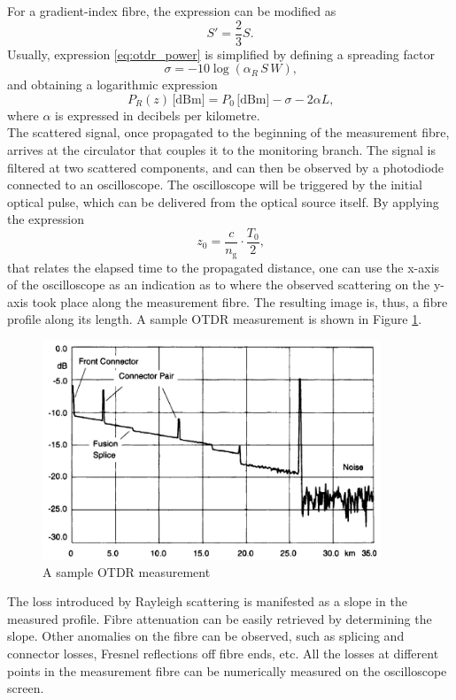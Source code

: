 \documentclass{standalone}
\begin{document}
For a gradient-index fibre, the expression can be modified as
\begin{equation}
S' = \frac{2}{3} S \textrm{.}
\end{equation}
Usually, expression \ref{eq:otdr_power} is simplified by defining a spreading factor
\begin{equation}
\sigma = -10 \log \left( \alpha_R \, S \, W \right) \textrm{,}
\end{equation}
and obtaining a logarithmic expression
\begin{equation}
P_R(z) \,\textrm{[dBm]} = P_0 \,\textrm{[dBm]} - \sigma - 2\alpha L \textrm{,}
\end{equation}
where $\alpha$ is expressed in decibels per kilometre. \\

The scattered signal, once propagated to the beginning of the measurement fibre, arrives at the circulator that couples it to the monitoring branch. The signal is filtered at two scattered components, and can then be observed by a photodiode connected to an oscilloscope. The oscilloscope will be triggered by the initial optical pulse, which can be delivered from the optical source itself. By applying the expression 
\begin{equation} \label{eq:otdr_time_distance}
z_0 = \frac{c}{n_\textrm{g}} \cdot \frac{T_0}{2} \textrm{,}
\end{equation}
that relates the elapsed time to the propagated distance, one can use the x-axis of the oscilloscope as an indication as to where the observed scattering on the y-axis took place along the measurement fibre. The resulting image is, thus, a fibre profile along its length. A sample OTDR measurement is shown in Figure \ref{fig:otdr_sample}.
\begin{figure}[h]
	\centering
	\includegraphics[width=0.9\textwidth]{otdr_sample.png}
	\caption{A sample OTDR measurement}
	\label{fig:otdr_sample}
\end{figure}
The loss introduced by Rayleigh scattering is manifested as a slope in the measured profile. Fibre attenuation can be easily retrieved by determining the slope. Other anomalies on the fibre can be observed, such as splicing and connector losses, Fresnel reflections off fibre ends, etc. All the losses at different points in the measurement fibre can be numerically measured on the oscilloscope screen.\\
\end{document}
